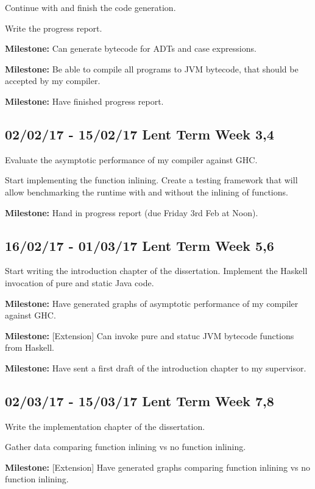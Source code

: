 \documentclass[12pt,a4paper,twoside]{article}
\begin{document}
    Continue with and finish the code generation.

    Write the progress report.

    \textbf{Milestone:} Can generate bytecode for ADTs and case expressions.

    \textbf{Milestone:} Be able to compile all programs to JVM bytecode, that should be accepted by my compiler.

    \textbf{Milestone:} Have finished progress report.

    \subsection*{02/02/17 - 15/02/17 \hfill Lent Term Week 3,4}

      Evaluate the asymptotic performance of my compiler against GHC.

      Start implementing the function inlining. Create a testing framework that will allow benchmarking the runtime with and without the
      inlining of functions.


      \textbf{Milestone:} Hand in progress report (due Friday 3rd Feb at Noon).

    \subsection*{16/02/17 - 01/03/17 \hfill Lent Term Week 5,6}

      Start writing the introduction chapter of the dissertation. Implement the Haskell invocation of pure and static Java code.

      \textbf{Milestone:} Have generated graphs of asymptotic performance of my compiler against GHC.

      \textbf{Milestone:} [Extension] Can invoke pure and statuc JVM bytecode functions from Haskell.

      \textbf{Milestone:} Have sent a first draft of the introduction chapter to my supervisor.

    \subsection*{02/03/17 - 15/03/17 \hfill Lent Term Week 7,8}

      Write the implementation chapter of the dissertation.

      Gather data comparing function inlining vs no function inlining.

     \textbf{Milestone:} [Extension] Have generated graphs comparing function inlining vs no function inlining.
      
\end{document}
